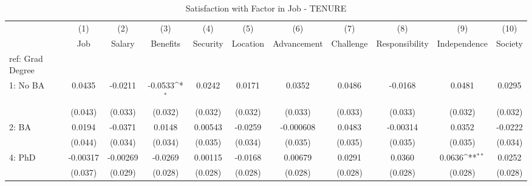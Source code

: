\begin{table}[htbp]\centering
\def\sym#1{\ifmmode^{#1}\else\(^{#1}\)\fi}
\caption{Satisfaction with Factor in Job - TENURE \label{tab1}}
\begin{tabular}{l*{10}{c}}
\hline\hline
  &\multicolumn{1}{c}{(1)}&\multicolumn{1}{c}{(2)}&\multicolumn{1}{c}{(3)}&\multicolumn{1}{c}{(4)}&\multicolumn{1}{c}{(5)}&\multicolumn{1}{c}{(6)}&\multicolumn{1}{c}{(7)}&\multicolumn{1}{c}{(8)}&\multicolumn{1}{c}{(9)}&\multicolumn{1}{c}{(10)}\\
  &\multicolumn{1}{c}{Job}&\multicolumn{1}{c}{Salary}&\multicolumn{1}{c}{Benefits}&\multicolumn{1}{c}{Security}&\multicolumn{1}{c}{Location}&\multicolumn{1}{c}{Advancement}&\multicolumn{1}{c}{Challenge}&\multicolumn{1}{c}{Responsibility}&\multicolumn{1}{c}{Independence}&\multicolumn{1}{c}{Society}\\
\hline
ref: Grad Degree&                     &                     &                     &                     &                     &                     &                     &                     &                     &                     \\
[1em]
1: No BA&      0.0435         &     -0.0211         &     -0.0533\sym{*}  &      0.0242         &      0.0171         &      0.0352         &      0.0486         &     -0.0168         &      0.0481         &      0.0295         \\
  &     (0.043)         &     (0.033)         &     (0.032)         &     (0.032)         &     (0.032)         &     (0.033)         &     (0.033)         &     (0.033)         &     (0.032)         &     (0.032)         \\
[1em]
2: BA&      0.0194         &     -0.0371         &      0.0148         &     0.00543         &     -0.0259         &   -0.000608         &      0.0483         &    -0.00314         &      0.0352         &     -0.0222         \\
  &     (0.044)         &     (0.034)         &     (0.034)         &     (0.035)         &     (0.034)         &     (0.035)         &     (0.035)         &     (0.035)         &     (0.035)         &     (0.034)         \\
[1em]
4: PhD&    -0.00317         &    -0.00269         &     -0.0269         &     0.00115         &     -0.0168         &     0.00679         &      0.0291         &      0.0360         &      0.0636\sym{**} &      0.0252         \\
  &     (0.037)         &     (0.029)         &     (0.028)         &     (0.028)         &     (0.028)         &     (0.028)         &     (0.028)         &     (0.028)         &     (0.028)         &     (0.028)         \\

\end{tabular}
\end{table}
